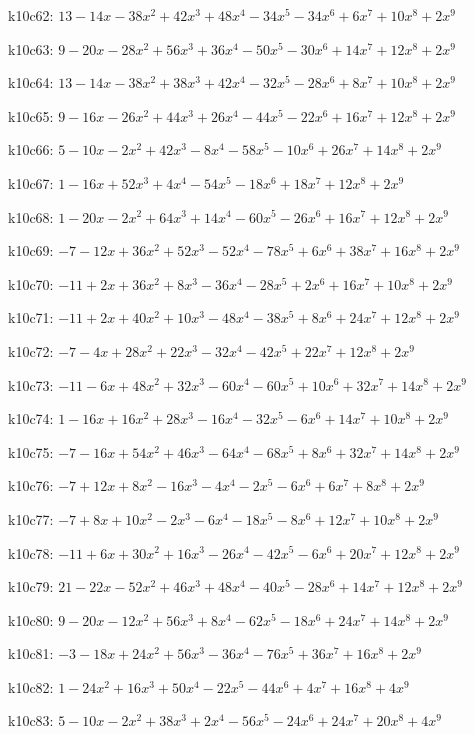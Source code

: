 k10c62: $ 13-14x-38x^{2}+42x^{3}+48x^{4}-34x^{5}-34x^{6}+6x^{7}+10x^{8}+2x^{9} $ 

k10c63: $ 9-20x-28x^{2}+56x^{3}+36x^{4}-50x^{5}-30x^{6}+14x^{7}+12x^{8}+2x^{9} $ 

k10c64: $ 13-14x-38x^{2}+38x^{3}+42x^{4}-32x^{5}-28x^{6}+8x^{7}+10x^{8}+2x^{9} $ 

k10c65: $ 9-16x-26x^{2}+44x^{3}+26x^{4}-44x^{5}-22x^{6}+16x^{7}+12x^{8}+2x^{9} $ 

k10c66: $ 5-10x-2x^{2}+42x^{3}-8x^{4}-58x^{5}-10x^{6}+26x^{7}+14x^{8}+2x^{9} $ 

k10c67: $ 1-16x+52x^{3}+4x^{4}-54x^{5}-18x^{6}+18x^{7}+12x^{8}+2x^{9} $ 

k10c68: $ 1-20x-2x^{2}+64x^{3}+14x^{4}-60x^{5}-26x^{6}+16x^{7}+12x^{8}+2x^{9} $ 

k10c69: $ -7-12x+36x^{2}+52x^{3}-52x^{4}-78x^{5}+6x^{6}+38x^{7}+16x^{8}+2x^{9} $ 

k10c70: $ -11+2x+36x^{2}+8x^{3}-36x^{4}-28x^{5}+2x^{6}+16x^{7}+10x^{8}+2x^{9} $ 

k10c71: $ -11+2x+40x^{2}+10x^{3}-48x^{4}-38x^{5}+8x^{6}+24x^{7}+12x^{8}+2x^{9} $ 

k10c72: $ -7-4x+28x^{2}+22x^{3}-32x^{4}-42x^{5}+22x^{7}+12x^{8}+2x^{9} $ 

k10c73: $ -11-6x+48x^{2}+32x^{3}-60x^{4}-60x^{5}+10x^{6}+32x^{7}+14x^{8}+2x^{9} $ 

k10c74: $ 1-16x+16x^{2}+28x^{3}-16x^{4}-32x^{5}-6x^{6}+14x^{7}+10x^{8}+2x^{9} $ 

k10c75: $ -7-16x+54x^{2}+46x^{3}-64x^{4}-68x^{5}+8x^{6}+32x^{7}+14x^{8}+2x^{9} $ 

k10c76: $ -7+12x+8x^{2}-16x^{3}-4x^{4}-2x^{5}-6x^{6}+6x^{7}+8x^{8}+2x^{9} $ 

k10c77: $ -7+8x+10x^{2}-2x^{3}-6x^{4}-18x^{5}-8x^{6}+12x^{7}+10x^{8}+2x^{9} $ 

k10c78: $ -11+6x+30x^{2}+16x^{3}-26x^{4}-42x^{5}-6x^{6}+20x^{7}+12x^{8}+2x^{9} $ 

k10c79: $ 21-22x-52x^{2}+46x^{3}+48x^{4}-40x^{5}-28x^{6}+14x^{7}+12x^{8}+2x^{9} $ 

k10c80: $ 9-20x-12x^{2}+56x^{3}+8x^{4}-62x^{5}-18x^{6}+24x^{7}+14x^{8}+2x^{9} $ 

k10c81: $ -3-18x+24x^{2}+56x^{3}-36x^{4}-76x^{5}+36x^{7}+16x^{8}+2x^{9} $ 

k10c82: $ 1-24x^{2}+16x^{3}+50x^{4}-22x^{5}-44x^{6}+4x^{7}+16x^{8}+4x^{9} $ 

k10c83: $ 5-10x-2x^{2}+38x^{3}+2x^{4}-56x^{5}-24x^{6}+24x^{7}+20x^{8}+4x^{9} $ 

